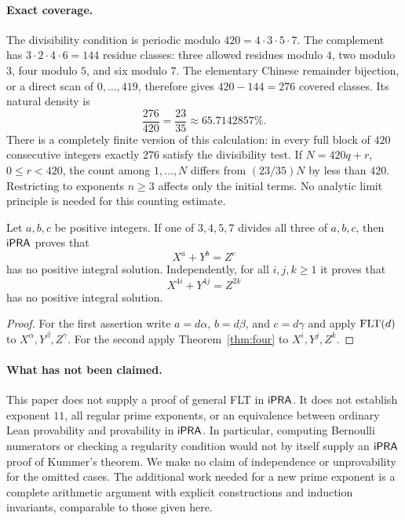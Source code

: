 \paragraph{Exact coverage.}
The divisibility condition is periodic modulo $420=4\cdot3\cdot5\cdot7$.
The complement has
$3\cdot2\cdot4\cdot6=144$ residue classes: three allowed residues modulo
$4$, two modulo $3$, four modulo $5$, and six modulo $7$. The elementary
Chinese remainder bijection, or a direct scan of $0,\ldots,419$, therefore
gives $420-144=276$ covered classes. Its natural density is
\[
 \frac{276}{420}=\frac{23}{35}\approx65.7142857\%.
\]
There is a completely finite version of this calculation: in every full
block of $420$ consecutive integers exactly $276$ satisfy the divisibility
test. If $N=420q+r$, $0\leq r<420$, the count among $1,\ldots,N$
differs from $(23/35)N$ by less than $420$. Restricting to exponents
$n\geq3$ affects only the initial terms. No analytic limit principle is
needed for this counting estimate.

\begin{corollary}\label{cor:mixed}
Let $a,b,c$ be positive integers. If one of $3,4,5,7$ divides all three
of $a,b,c$, then $\mathsf{iPRA}$ proves that
\[
 X^a+Y^b=Z^c
\]
has no positive integral solution. Independently, for all $i,j,k\geq1$
it proves that
\[
 X^{4i}+Y^{4j}=Z^{2k}
\]
has no positive integral solution.
\end{corollary}

\begin{proof}
For the first assertion write $a=d\alpha$, $b=d\beta$, and
$c=d\gamma$ and apply $\operatorname{FLT}(d)$ to
$X^\alpha,Y^\beta,Z^\gamma$. For the second apply
Theorem~\ref{thm:four} to $X^i,Y^j,Z^k$.
\end{proof}

\paragraph{What has not been claimed.}
This paper does not supply a proof of general FLT in $\mathsf{iPRA}$. It does
not establish exponent $11$, all regular prime exponents, or an
equivalence between ordinary Lean provability and provability in $\mathsf{iPRA}$.
In particular, computing Bernoulli numerators or checking a regularity
condition would not by itself supply an $\mathsf{iPRA}$ proof of Kummer's theorem.
We make no claim of independence or unprovability for the omitted cases.
The additional work needed for a new prime exponent is a complete
arithmetic argument with explicit constructions and induction invariants,
comparable to those given here.

